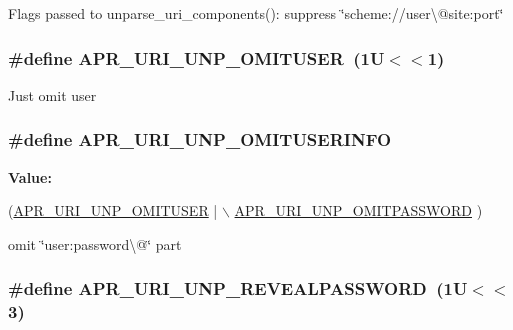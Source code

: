 Flags passed to unparse\-\_\-uri\-\_\-components()\-: suppress \char`\"{}scheme\-://user\textbackslash{}@site\-:port\char`\"{} \hypertarget{group___a_p_r___util___u_r_i_ga93a8095f746bb8d4f4e5d8d6ca102ebc}{
\subsubsection[{A\-P\-R\-\_\-\-U\-R\-I\-\_\-\-U\-N\-P\-\_\-\-O\-M\-I\-T\-U\-S\-E\-R}]{\setlength{\rightskip}{0pt plus 5cm}\#define A\-P\-R\-\_\-\-U\-R\-I\-\_\-\-U\-N\-P\-\_\-\-O\-M\-I\-T\-U\-S\-E\-R~(1\-U$<$$<$1)}}\label{group___a_p_r___util___u_r_i_ga93a8095f746bb8d4f4e5d8d6ca102ebc}
Just omit user \hypertarget{group___a_p_r___util___u_r_i_gad573c75c47cc369ffc0a5776c3613494}{
\subsubsection[{A\-P\-R\-\_\-\-U\-R\-I\-\_\-\-U\-N\-P\-\_\-\-O\-M\-I\-T\-U\-S\-E\-R\-I\-N\-F\-O}]{\setlength{\rightskip}{0pt plus 5cm}\#define A\-P\-R\-\_\-\-U\-R\-I\-\_\-\-U\-N\-P\-\_\-\-O\-M\-I\-T\-U\-S\-E\-R\-I\-N\-F\-O}}\label{group___a_p_r___util___u_r_i_gad573c75c47cc369ffc0a5776c3613494}
{\bfseries Value\-:}
\begin{DoxyCode}
(\hyperlink{group___a_p_r___util___u_r_i_ga93a8095f746bb8d4f4e5d8d6ca102ebc}{APR\_URI\_UNP\_OMITUSER} | \hyperlink{group___a_p_r___util___u_r_i_gaed3be741b9a68eb4ee156c6a35b137ff}{\(\backslash\)}
\hyperlink{group___a_p_r___util___u_r_i_gaed3be741b9a68eb4ee156c6a35b137ff}{                                     APR\_URI\_UNP\_OMITPASSWORD}
      )
\end{DoxyCode}
omit \char`\"{}user\-:password\textbackslash{}@\char`\"{} part \hypertarget{group___a_p_r___util___u_r_i_ga527cd70521f12a7962df9976068dda29}{
\subsubsection[{A\-P\-R\-\_\-\-U\-R\-I\-\_\-\-U\-N\-P\-\_\-\-R\-E\-V\-E\-A\-L\-P\-A\-S\-S\-W\-O\-R\-D}]{\setlength{\rightskip}{0pt plus 5cm}\#define A\-P\-R\-\_\-\-U\-R\-I\-\_\-\-U\-N\-P\-\_\-\-R\-E\-V\-E\-A\-L\-P\-A\-S\-S\-W\-O\-R\-D~(1\-U$<$$<$3)}}\label{group___a_p_r___util___u_r_i_ga527cd70521f12a7962df9976068dda29}
